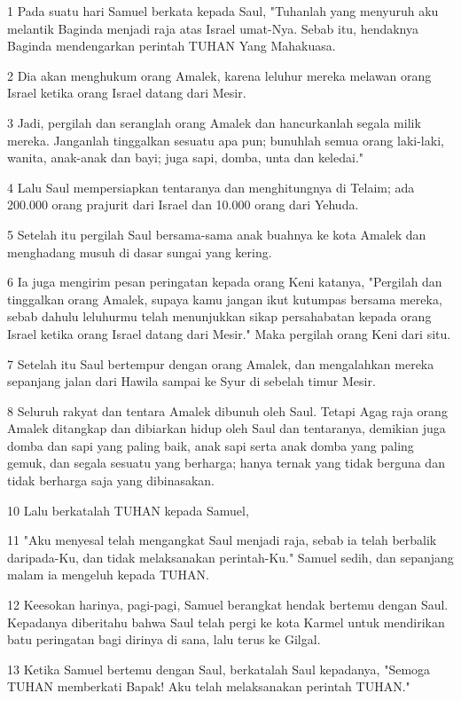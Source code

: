 \par 1 Pada suatu hari Samuel berkata kepada Saul, "Tuhanlah yang menyuruh aku melantik Baginda menjadi raja atas Israel umat-Nya. Sebab itu, hendaknya Baginda mendengarkan perintah TUHAN Yang Mahakuasa.
\par 2 Dia akan menghukum orang Amalek, karena leluhur mereka melawan orang Israel ketika orang Israel datang dari Mesir.
\par 3 Jadi, pergilah dan seranglah orang Amalek dan hancurkanlah segala milik mereka. Janganlah tinggalkan sesuatu apa pun; bunuhlah semua orang laki-laki, wanita, anak-anak dan bayi; juga sapi, domba, unta dan keledai."
\par 4 Lalu Saul mempersiapkan tentaranya dan menghitungnya di Telaim; ada 200.000 orang prajurit dari Israel dan 10.000 orang dari Yehuda.
\par 5 Setelah itu pergilah Saul bersama-sama anak buahnya ke kota Amalek dan menghadang musuh di dasar sungai yang kering.
\par 6 Ia juga mengirim pesan peringatan kepada orang Keni katanya, "Pergilah dan tinggalkan orang Amalek, supaya kamu jangan ikut kutumpas bersama mereka, sebab dahulu leluhurmu telah menunjukkan sikap persahabatan kepada orang Israel ketika orang Israel datang dari Mesir." Maka pergilah orang Keni dari situ.
\par 7 Setelah itu Saul bertempur dengan orang Amalek, dan mengalahkan mereka sepanjang jalan dari Hawila sampai ke Syur di sebelah timur Mesir.
\par 8 Seluruh rakyat dan tentara Amalek dibunuh oleh Saul. Tetapi Agag raja orang Amalek ditangkap dan dibiarkan hidup oleh Saul dan tentaranya, demikian juga domba dan sapi yang paling baik, anak sapi serta anak domba yang paling gemuk, dan segala sesuatu yang berharga; hanya ternak yang tidak berguna dan tidak berharga saja yang dibinasakan.
\par 10 Lalu berkatalah TUHAN kepada Samuel,
\par 11 "Aku menyesal telah mengangkat Saul menjadi raja, sebab ia telah berbalik daripada-Ku, dan tidak melaksanakan perintah-Ku." Samuel sedih, dan sepanjang malam ia mengeluh kepada TUHAN.
\par 12 Keesokan harinya, pagi-pagi, Samuel berangkat hendak bertemu dengan Saul. Kepadanya diberitahu bahwa Saul telah pergi ke kota Karmel untuk mendirikan batu peringatan bagi dirinya di sana, lalu terus ke Gilgal.
\par 13 Ketika Samuel bertemu dengan Saul, berkatalah Saul kepadanya, "Semoga TUHAN memberkati Bapak! Aku telah melaksanakan perintah TUHAN."
